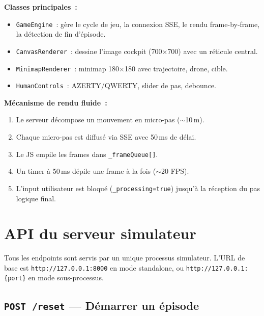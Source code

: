 \documentclass[a4paper, 11pt, french]{article}
\newcommand{\code}[1]{\texttt{#1}}
\newcommand{\apiendpoint}[2]{\texorpdfstring{\texttt{#1}~\texttt{#2}}{#1 #2}}
\begin{document}
\textbf{Classes principales~:}
\begin{itemize}
  \item \code{GameEngine}~: gère le cycle de jeu, la connexion SSE,
        le rendu frame-by-frame, la détection de fin d'épisode.
  \item \code{CanvasRenderer}~: dessine l'image cockpit (700$\times$700)
        avec un réticule central.
  \item \code{MinimapRenderer}~: minimap 180$\times$180 avec trajectoire,
        drone, cible.
  \item \code{HumanControls}~: AZERTY/QWERTY, slider de pas, debounce.
\end{itemize}

\textbf{Mécanisme de rendu fluide~:}
\begin{enumerate}
  \item Le serveur décompose un mouvement en micro-pas ($\sim$10\,m).
  \item Chaque micro-pas est diffusé via SSE avec 50\,ms de délai.
  \item Le JS empile les frames dans \code{\_frameQueue[]}.
  \item Un timer à 50\,ms dépile une frame à la fois ($\sim$20 FPS).
  \item L'input utilisateur est bloqué (\code{\_processing=true})
        jusqu'à la réception du pas logique final.
\end{enumerate}

\section{API du serveur simulateur}
\label{sec:api-sim}

Tous les endpoints sont servis par un unique processus simulateur.
L'URL de base est \code{http://127.0.0.1:8000} en mode standalone,
ou \code{http://127.0.0.1:\{port\}} en mode sous-processus.

\subsection{\apiendpoint{POST}{/reset} --- Démarrer un épisode}
\end{document}
